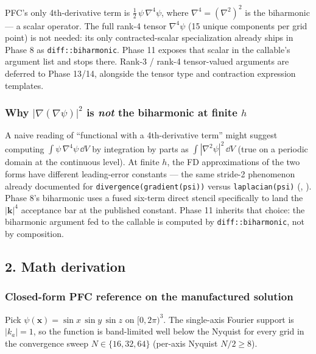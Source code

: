 PFC's only 4th-derivative term is \(\tfrac{1}{2}\,\psi\,\nabla^4\psi\),
where \(\nabla^4 = (\nabla^2)^2\) is the biharmonic --- a scalar
operator. The full rank-4 tensor \(\nabla^4\psi\) (15 unique components
per grid point) is not needed: its only contracted-scalar specialization
already ships in Phase 8 as
\passthrough{\lstinline!diff::biharmonic!}. Phase 11 exposes that
scalar in the callable's argument list and stops there. Rank-3 / rank-4
tensor-valued arguments are deferred to Phase 13/14, alongside the
tensor type and contraction expression templates.

\subsubsection{Why \(|\nabla(\nabla\psi)|^2\) is \emph{not} the
biharmonic at finite \(h\)}\label{phase11-why-direct}

A naive reading of ``functional with a 4th-derivative term'' might
suggest computing
\(\int \psi\,\nabla^4\psi\,\dd V\) by integration by parts as
\(\int |\nabla^2\psi|^2\,\dd V\) (true on a periodic domain at the
continuous level). At finite \(h\), the FD approximations of the two
forms have different leading-error constants --- the same stride-2
phenomenon already documented for
\passthrough{\lstinline!divergence(gradient(psi))!} versus
\passthrough{\lstinline!laplacian(psi)!}
(,
). Phase 8's biharmonic uses a fused
six-term direct stencil specifically to land the \(|\mathbf{k}|^4\)
acceptance bar at the published constant. Phase 11 inherits that
choice: the biharmonic argument fed to the callable is computed by
\passthrough{\lstinline!diff::biharmonic!}, not by composition.

\subsection{2. Math derivation}\label{phase11-math}

\subsubsection{Closed-form PFC reference on the manufactured
solution}\label{phase11-closed-form}

Pick \(\psi(\mathbf{x}) = \sin x\,\sin y\,\sin z\) on
\([0, 2\pi)^3\). The single-axis Fourier support is \(|k_a| = 1\), so
the function is band-limited well below the Nyquist for every grid in
the convergence sweep \(N \in \{16, 32, 64\}\) (per-axis Nyquist
\(N/2 \geq 8\)).

